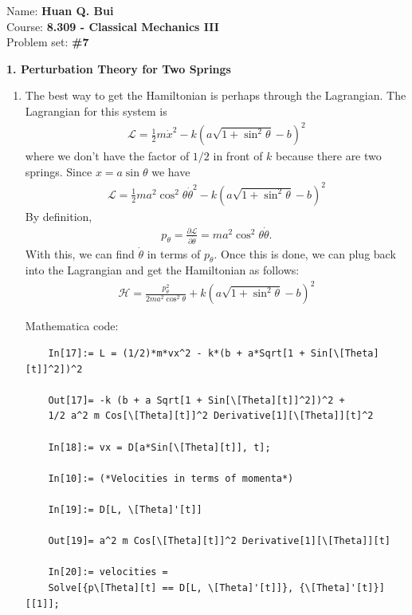 \documentclass{article}
\theoremstyle{definition}
\newcommand{\p}{\partial}
\newcommand{\lag}{\mathcal{L}}
\newcommand{\ham}{\mathcal{H}}
\newcommand{\f}[2]{\frac{#1}{#2}}
\newcommand{\lp}{\left(}
\newcommand{\rp}{\right)}
\begin{document}
	
\begin{framed}
	\noindent Name: \textbf{Huan Q. Bui}\\
	Course: \textbf{8.309 - Classical Mechanics III}\\
	Problem set: \textbf{\#7}
\end{framed}



\noindent \textbf{1. Perturbation Theory for Two Springs}

\begin{enumerate}[label=(\alph*)]
	\item The best way to get the Hamiltonian is perhaps through the Lagrangian. The Lagrangian for this system is 
	\begin{align*}
	\lag = \f{1}{2}m \dot{x}^2 - k\lp a\sqrt{1 + \sin^2\theta}- b \rp ^2
	\end{align*}
	where we don't have the factor of $1/2$ in front of $k$ because there are two springs. Since $x = a\sin\theta$ we have
	\begin{align*}
	\lag = \f{1}{2}m a^2\cos^2\theta\dot\theta^2 - k\lp a\sqrt{1 + \sin^2\theta} - b\rp ^2
	\end{align*}
	By definition, 
	\begin{align*}
	p_\theta = \f{\p \lag}{\p \dot{\theta}} = ma^2\cos^2\theta \dot\theta.
	\end{align*}
	With this, we can find $\dot\theta$ in terms of $p_\theta$. Once this is done, we can plug back into the Lagrangian and get the Hamiltonian as follows:
	\begin{align*}
	\boxed{\ham = \f{p_\theta^2}{2ma^2 \cos^2\theta} + k\lp a\sqrt{1+\sin^2\theta} -b \rp^2}
	\end{align*}
	
	Mathematica code:
	\begin{lstlisting}
	In[17]:= L = (1/2)*m*vx^2 - k*(b + a*Sqrt[1 + Sin[\[Theta][t]]^2])^2
	
	Out[17]= -k (b + a Sqrt[1 + Sin[\[Theta][t]]^2])^2 + 
	1/2 a^2 m Cos[\[Theta][t]]^2 Derivative[1][\[Theta]][t]^2
	
	In[18]:= vx = D[a*Sin[\[Theta][t]], t];
	
	In[10]:= (*Velocities in terms of momenta*)
	
	In[19]:= D[L, \[Theta]'[t]]
	
	Out[19]= a^2 m Cos[\[Theta][t]]^2 Derivative[1][\[Theta]][t]
	
	In[20]:= velocities = 
	Solve[{p\[Theta][t] == D[L, \[Theta]'[t]]}, {\[Theta]'[t]}][[1]];
	

\end{lstlisting}
\end{enumerate}
\end{document}
